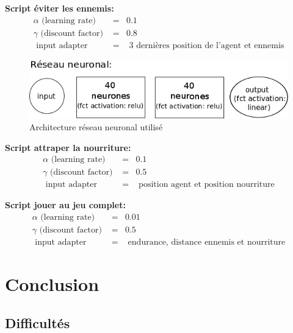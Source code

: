 \documentclass[11pt,a4paper]{report}
\begin{document}
   \textbf{Script éviter les ennemis:}
   \begin{eqnarray}
   \alpha \text{ (learning rate) } &=& 0.1 \\
   \gamma \text{ (discount factor) } &=& 0.8 \\
   \text{ input adapter } &=& \text{ 3 dernières position de l'agent et ennemis}
   \end{eqnarray}   
   
   \begin{figure}[!h]
   \center
   \includegraphics[scale=0.45]{ressources/nn_model.png}
   \caption{Architecture réseau neuronal utilisé}
   \end{figure} 
   
   
   \textbf{Script attraper la nourriture:}
   \begin{eqnarray}
   \alpha \text{ (learning rate) } &=& 0.1 \\
   \gamma \text{ (discount factor) } &=& 0.5 \\
   \text{ input adapter } &=& \text{ position agent et position nourriture}
   \end{eqnarray}   
   
   \textbf{Script jouer au jeu complet:}
   \begin{eqnarray}
   \alpha \text{ (learning rate) } &=& 0.01 \\
   \gamma \text{ (discount factor) } &=& 0.5 \\
   \text{ input adapter } &=& \text{ endurance, distance ennemis et nourriture}
   \end{eqnarray}   
  
  \chapter{Conclusion}
  
  \section{Difficultés}
  
\end{document}
